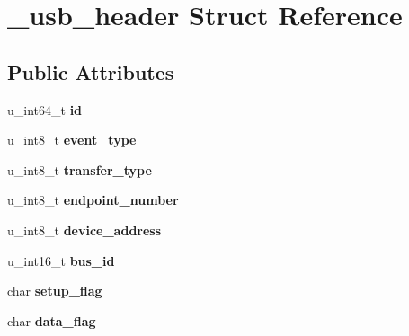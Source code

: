 \hypertarget{struct__usb__header}{
\section{\_\-usb\_\-header Struct Reference}
\label{struct__usb__header}
}
\subsection*{Public Attributes}
\begin{DoxyCompactItemize}
\item 
\hypertarget{struct__usb__header_aba16d1f42280d6dda92b21021797c3ee}{
u\_\-int64\_\-t {\bfseries id}}
\label{struct__usb__header_aba16d1f42280d6dda92b21021797c3ee}

\item 
\hypertarget{struct__usb__header_a9708136e9462e90ebc5100033b2dba58}{
u\_\-int8\_\-t {\bfseries event\_\-type}}
\label{struct__usb__header_a9708136e9462e90ebc5100033b2dba58}

\item 
\hypertarget{struct__usb__header_a39b8721c6c61bb2096b4fb1af95e9a06}{
u\_\-int8\_\-t {\bfseries transfer\_\-type}}
\label{struct__usb__header_a39b8721c6c61bb2096b4fb1af95e9a06}

\item 
\hypertarget{struct__usb__header_a5be95fda4a1b0ce92855e9087bf4e59b}{
u\_\-int8\_\-t {\bfseries endpoint\_\-number}}
\label{struct__usb__header_a5be95fda4a1b0ce92855e9087bf4e59b}

\item 
\hypertarget{struct__usb__header_aac6f1a1fd98410845626eec7850c2597}{
u\_\-int8\_\-t {\bfseries device\_\-address}}
\label{struct__usb__header_aac6f1a1fd98410845626eec7850c2597}

\item 
\hypertarget{struct__usb__header_a888b06feb0ef7994b3beaea72e1be31d}{
u\_\-int16\_\-t {\bfseries bus\_\-id}}
\label{struct__usb__header_a888b06feb0ef7994b3beaea72e1be31d}

\item 
\hypertarget{struct__usb__header_a3a98c467b6f5d7cfc81b4889637488f4}{
char {\bfseries setup\_\-flag}}
\label{struct__usb__header_a3a98c467b6f5d7cfc81b4889637488f4}

\item 
\hypertarget{struct__usb__header_ac98b6745eaca137c6103bd60b579e32c}{
char {\bfseries data\_\-flag}}
\label{struct__usb__header_ac98b6745eaca137c6103bd60b579e32c}


\end{DoxyCompactItemize}
